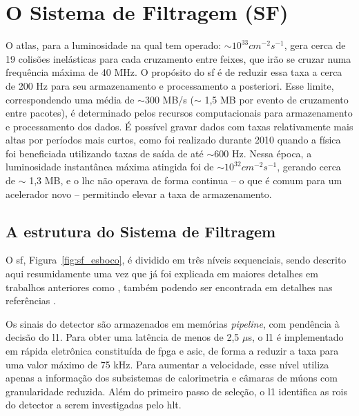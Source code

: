 \section{O Sistema de Filtragem (SF)}
\label{sec:sf}


O \gls{atlas}, para a luminosidade na qual tem operado: $\sim10^{33}cm^{-2}s^{-1}$,
gera cerca de 19 colisões inelásticas para cada cruzamento entre
feixes, que irão se cruzar numa frequência máxima de 40 MHz. O propósito do
\gls{sf} \cite{trigger_perf_2010,trigger_tdr} é de reduzir essa taxa a cerca
de 200 Hz para seu armazenamento e processamento a posteriori. Esse
limite, correspondendo uma média de $\sim$300 MB/s ($\sim$ 1,5 MB por evento de
cruzamento entre pacotes), é determinado pelos recursos
computacionais para armazenamento e processamento dos dados. É possível gravar
dados com taxas relativamente mais altas por períodos mais curtos, como foi
realizado durante 2010 quando a física foi beneficiada utilizando taxas de saída
de até $\sim$600 Hz. Nessa época, a luminosidade instantânea máxima atingida foi de
$\sim10^{32}cm^{-2}s^{-1}$, gerando cerca de $\sim$ 1,3 MB, e o \gls{lhc} não 
operava de forma continua -- o que é comum para um acelerador novo -- permitindo 
elevar a taxa de armazenamento.

\subsection{A estrutura do Sistema de Filtragem}
\label{ssec:estru_sf}

O \gls{sf}, Figura~\ref{fig:sf_esboco}, é dividido em três níveis sequenciais,
sendo descrito aqui resumidamente uma vez que já foi explicada em maiores detalhes em
trabalhos anteriores como \cite{tese_eduardo,tese_torres}, também podendo ser encontrada 
em detalhes nas referências \cite{trigger_tdr,l1_trigger_tdr,l2_ef_daq_dcs_tdr,trigger_perfomance}.

Os sinais do detector são armazenados em memórias \emph{pipeline}, com pendência
à decisão do \acrshort{l1}. Para obter uma latência de menos de 2,5 $\mu$s, 
o \gls{l1} é implementado em rápida eletrônica constituída de \gls{fpga} e
\gls{asic}, de forma a reduzir a taxa para uma valor máximo de 75 kHz. Para
aumentar a velocidade, esse nível utiliza apenas a informação dos subsistemas de
calorimetria e câmaras de múons com granularidade reduzida. Além do
primeiro passo de seleção, o \gls{l1} identifica as \glspl{roi} do detector a
serem investigadas pelo \acrshort{hlt}. 

